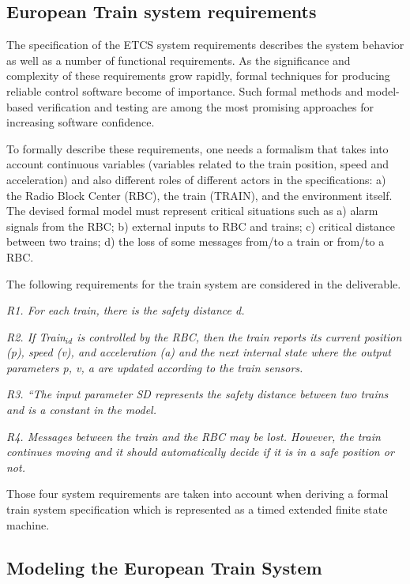 \documentclass{template/openetcs_article}
\begin{document}
\subsection{European Train system requirements}\label{sec1}

The specification of the ETCS system requirements describes the system behavior as well as a number of functional requirements. As the significance and complexity of these requirements grow rapidly, formal techniques for producing reliable control software become of importance. Such formal methods and model-based verification and testing are among the most promising approaches for increasing software confidence.

To formally describe these requirements, one needs a formalism that takes into account continuous variables (variables related to the train position, speed and acceleration) and also different roles of different actors in the specifications: a) the Radio Block Center (RBC), the train (TRAIN), and the environment itself. The devised formal model must represent critical situations such as a) alarm signals from the RBC; b) external inputs to RBC and trains; c) critical distance between two trains; d) the loss of some messages from/to a train or from/to a RBC.  

The following requirements for the train system are considered in the deliverable.

\textit{R1. For each train, there is the safety distance d.}

\textit{R2. If Train$_{id}$ is controlled by the RBC, then the train reports its current position (p), speed (v), and acceleration (a) and the next internal state where the output parameters p, v, a are updated according to the train sensors.}

\textit{R3. “The input parameter SD represents the safety distance between two trains and is a constant in the model.}

\textit{R4. Messages between the train and the RBC may be lost. However, the train continues moving and it should automatically decide if it is in a safe position or not.}

Those four system requirements are taken into account when deriving a formal train system specification which is represented as a timed extended finite state machine.

\subsection{Modeling the European Train System}\label{sec2}
\end{document}
